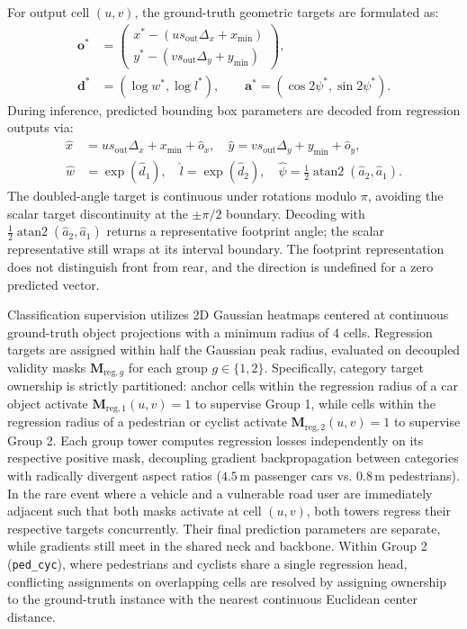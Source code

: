 For output cell $(u, v)$, the ground-truth geometric targets are formulated as:
\begin{align}
    \mathbf{o}^* &= \begin{pmatrix} x^* - (u s_{\mathrm{out}}\Delta_x + x_{\min}) \\ y^* - (v s_{\mathrm{out}}\Delta_y + y_{\min}) \end{pmatrix},\nonumber\\
    \mathbf{d}^* &= (\log w^*, \log l^*), \qquad \mathbf{a}^* = (\cos 2\psi^*, \sin 2\psi^*).
    \label{eq:gt_targets}
\end{align}
During inference, predicted bounding box parameters are decoded from regression outputs via:
\begin{align}
    \hat{x} &= u s_{\mathrm{out}}\Delta_x + x_{\min} + \hat{o}_x, \quad \hat{y} = v s_{\mathrm{out}}\Delta_y + y_{\min} + \hat{o}_y,\nonumber\\
    \hat{w} &= \exp(\hat{d}_1), \quad \hat{l} = \exp(\hat{d}_2), \quad \hat{\psi} = \frac{1}{2}\operatorname{atan2}(\hat{a}_2, \hat{a}_1).
    \label{eq:decoded_targets}
\end{align}
The doubled-angle target is continuous under rotations modulo $\pi$, avoiding the scalar target discontinuity at the $\pm\pi/2$ boundary. Decoding with $\frac{1}{2}\operatorname{atan2}(\hat{a}_2,\hat{a}_1)$ returns a representative footprint angle; the scalar representative still wraps at its interval boundary. The footprint representation does not distinguish front from rear, and the direction is undefined for a zero predicted vector.

Classification supervision utilizes 2D Gaussian heatmaps centered at continuous ground-truth object projections with a minimum radius of 4 cells. Regression targets are assigned within half the Gaussian peak radius, evaluated on decoupled validity masks $\mathbf{M}_{\mathrm{reg}, g}$ for each group $g \in \{1, 2\}$. Specifically, category target ownership is strictly partitioned: anchor cells within the regression radius of a car object activate $\mathbf{M}_{\mathrm{reg}, 1}(u, v) = 1$ to supervise Group 1, while cells within the regression radius of a pedestrian or cyclist activate $\mathbf{M}_{\mathrm{reg}, 2}(u, v) = 1$ to supervise Group 2. Each group tower computes regression losses independently on its respective positive mask, decoupling gradient backpropagation between categories with radically divergent aspect ratios ($4.5$\,m passenger cars vs. $0.8$\,m pedestrians). In the rare event where a vehicle and a vulnerable road user are immediately adjacent such that both masks activate at cell $(u, v)$, both towers regress their respective targets concurrently. Their final prediction parameters are separate, while gradients still meet in the shared neck and backbone. Within Group 2 (\texttt{ped\_cyc}), where pedestrians and cyclists share a single regression head, conflicting assignments on overlapping cells are resolved by assigning ownership to the ground-truth instance with the nearest continuous Euclidean center distance.

